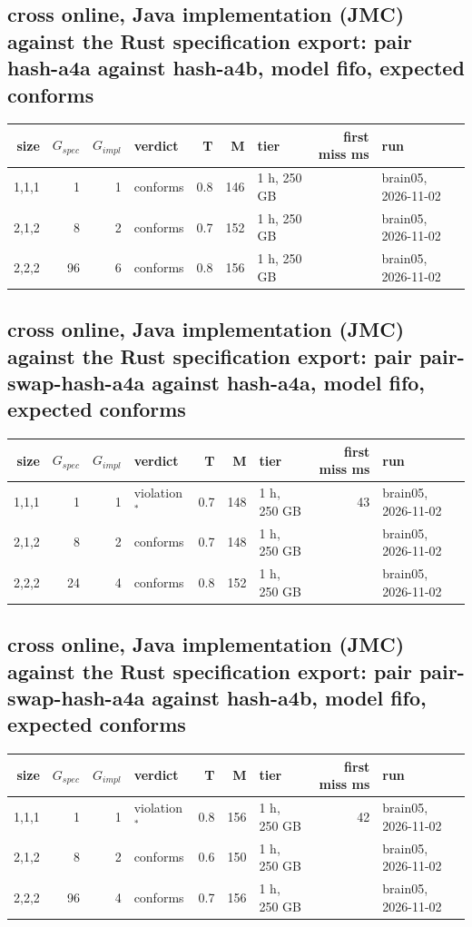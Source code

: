 \documentclass[10pt]{article}
\begin{document}
\subsection*{cross online, Java implementation (JMC) against the Rust specification export: pair \textsf{hash-a4a} against \textsf{hash-a4b}, model fifo, expected conforms}
\begin{longtable}{@{}rrrlrrlrl@{}}
\toprule
size & $G_{\mathit{spec}}$ & $G_{\mathit{impl}}$ & verdict & T & M & tier & first miss ms & run \\
\midrule
\endhead
\color{red} 1,1,1 & 1 & 1 & conforms & 0.8 & 146 & 1 h, 250 GB &  & brain05, 2026-11-02 \\
\color{red} 2,1,2 & 8 & 2 & conforms & 0.7 & 152 & 1 h, 250 GB &  & brain05, 2026-11-02 \\
\color{red} 2,2,2 & 96 & 6 & conforms & 0.8 & 156 & 1 h, 250 GB &  & brain05, 2026-11-02 \\
\bottomrule
\end{longtable}
\subsection*{cross online, Java implementation (JMC) against the Rust specification export: pair \textsf{pair-swap-hash-a4a} against \textsf{hash-a4a}, model fifo, expected conforms}
\begin{longtable}{@{}rrrlrrlrl@{}}
\toprule
size & $G_{\mathit{spec}}$ & $G_{\mathit{impl}}$ & verdict & T & M & tier & first miss ms & run \\
\midrule
\endhead
\color{red} 1,1,1 & 1 & 1 & violation$^{\ast}$ & 0.7 & 148 & 1 h, 250 GB & 43 & brain05, 2026-11-02 \\
\color{red} 2,1,2 & 8 & 2 & conforms & 0.7 & 148 & 1 h, 250 GB &  & brain05, 2026-11-02 \\
\color{red} 2,2,2 & 24 & 4 & conforms & 0.8 & 152 & 1 h, 250 GB &  & brain05, 2026-11-02 \\
\bottomrule
\end{longtable}
\subsection*{cross online, Java implementation (JMC) against the Rust specification export: pair \textsf{pair-swap-hash-a4a} against \textsf{hash-a4b}, model fifo, expected conforms}
\begin{longtable}{@{}rrrlrrlrl@{}}
\toprule
size & $G_{\mathit{spec}}$ & $G_{\mathit{impl}}$ & verdict & T & M & tier & first miss ms & run \\
\midrule
\endhead
\color{red} 1,1,1 & 1 & 1 & violation$^{\ast}$ & 0.8 & 156 & 1 h, 250 GB & 42 & brain05, 2026-11-02 \\
\color{red} 2,1,2 & 8 & 2 & conforms & 0.6 & 150 & 1 h, 250 GB &  & brain05, 2026-11-02 \\
\color{red} 2,2,2 & 96 & 4 & conforms & 0.7 & 156 & 1 h, 250 GB &  & brain05, 2026-11-02 \\
\bottomrule
\end{longtable}
\end{document}

